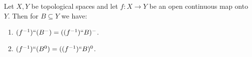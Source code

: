 Let $X, Y$ be topological spaces and let $f: X \rightarrow Y$ be an open continuous map onto $Y$. Then for $B \subseteq Y$ we have:

\begin{enumerate}
\item $(f^{-1})``(B^{-}) = ((f^{-1})``B)^{-}$.
\item $(f^{-1})``(B^{0}) = ((f^{-1})``B)^{0}$.
\end{enumerate}
